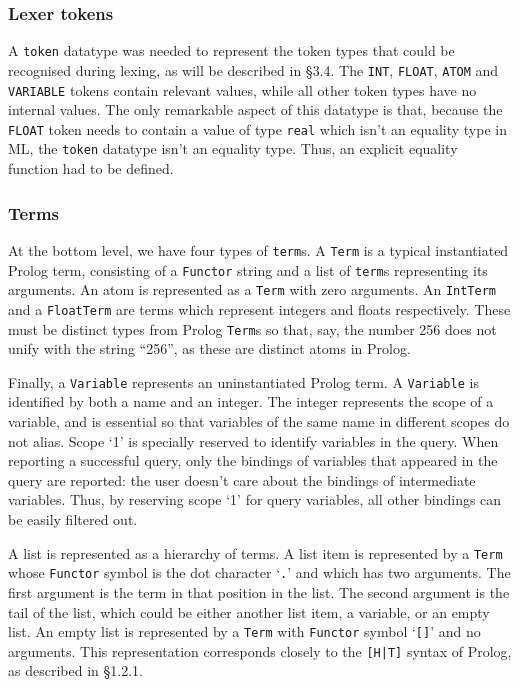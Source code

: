 \documentclass[12pt]{article}
\begin{document}
\subsubsection{Lexer tokens}

A \verb|token| datatype was needed to represent the token types that could be recognised during lexing, as will be described in \S3.4. 
The \verb|INT|, \verb|FLOAT|, \verb|ATOM| and \verb|VARIABLE| tokens contain relevant values, while all other token types have no internal values. 
The only remarkable aspect of this datatype is that, because the \verb|FLOAT| token needs to contain a value of type \verb|real| which isn't an equality type in ML, the \verb|token| datatype isn't an equality type. 
Thus, an explicit equality function had to be defined.

\subsubsection{Terms}

At the bottom level, we have four types of \verb|term|s. 
A \verb|Term| is a typical instantiated Prolog term, consisting of a \verb|Functor| string and a list of \verb|term|s representing its arguments. 
An atom is represented as a \verb|Term| with zero arguments.
An \verb|IntTerm| and a \verb|FloatTerm| are terms which represent integers and floats respectively. 
These must be distinct types from Prolog \verb|Term|s so that, say, the number 256 does not unify with the string ``256'', as these are distinct atoms in Prolog.

Finally, a \verb|Variable| represents an uninstantiated Prolog term. 
A \verb|Variable| is identified by both a name and an integer. 
The integer represents the scope of a variable, and is essential so that variables of the same name in different scopes do not alias. 
Scope `1' is specially reserved to identify variables in the query. 
When reporting a successful query, only the bindings of variables that appeared in the query are reported: the user doesn't care about the bindings of intermediate variables.
Thus, by reserving scope `1' for query variables, all other bindings can be easily filtered out.

A list is represented as a hierarchy of terms. 
A list item is represented by a \verb|Term| whose \verb|Functor| symbol is the dot character `\verb|.|' and which has two arguments. 
The first argument is the term in that position in the list. 
The second argument is the tail of the list, which could be either another list item, a variable, or an empty list.
An empty list is represented by a \verb|Term| with \verb|Functor| symbol `\verb|[]|' and no arguments. 
This representation corresponds closely to the \verb/[H|T]/ syntax of Prolog, as described in \S1.2.1.
\end{document}
